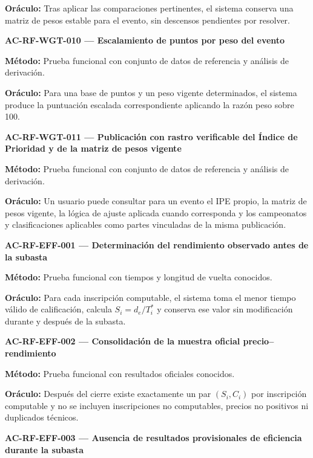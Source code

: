 \documentclass[10pt,letterpaper]{article}
\begin{document}
\textbf{Oráculo:} Tras aplicar las comparaciones pertinentes, el sistema conserva una matriz de pesos estable para el evento, sin descensos pendientes por resolver.\par\vspace{0.45em}
\noindent\textbf{AC-RF-WGT-010 --- Escalamiento de puntos por peso del evento}\par
\textbf{Método:} Prueba funcional con conjunto de datos de referencia y análisis de derivación.\par
\textbf{Oráculo:} Para una base de puntos y un peso vigente determinados, el sistema produce la puntuación escalada correspondiente aplicando la razón peso sobre 100.\par\vspace{0.45em}
\noindent\textbf{AC-RF-WGT-011 --- Publicación con rastro verificable del Índice de Prioridad y de la matriz de pesos vigente}\par
\textbf{Método:} Prueba funcional con conjunto de datos de referencia y análisis de derivación.\par
\textbf{Oráculo:} Un usuario puede consultar para un evento el IPE propio, la matriz de pesos vigente, la lógica de ajuste aplicada cuando corresponda y los campeonatos y clasificaciones aplicables como partes vinculadas de la misma publicación.\par\vspace{0.45em}
\noindent\textbf{AC-RF-EFF-001 --- Determinación del rendimiento observado antes de la subasta}\par
\textbf{Método:} Prueba funcional con tiempos y longitud de vuelta conocidos.\par
\textbf{Oráculo:} Para cada inscripción computable, el sistema toma el menor tiempo válido de calificación, calcula $S_i=d_e/T_i^*$ y conserva ese valor sin modificación durante y después de la subasta.\par\vspace{0.45em}
\noindent\textbf{AC-RF-EFF-002 --- Consolidación de la muestra oficial precio--rendimiento}\par
\textbf{Método:} Prueba funcional con resultados oficiales conocidos.\par
\textbf{Oráculo:} Después del cierre existe exactamente un par $(S_i,C_i)$ por inscripción computable y no se incluyen inscripciones no computables, precios no positivos ni duplicados técnicos.\par\vspace{0.45em}
\noindent\textbf{AC-RF-EFF-003 --- Ausencia de resultados provisionales de eficiencia durante la subasta}\par
\end{document}
